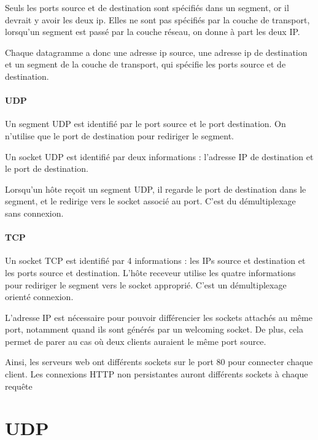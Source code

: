 	Seuls les ports source et de destination sont spécifiés dans un segment, or il devrait y avoir les deux ip. Elles ne sont pas spécifiés par la couche de transport, lorsqu'un segment est passé par la couche réseau, on donne à part les deux IP.
	
	Chaque datagramme a donc une adresse ip source, une adresse ip de destination et un segment de la couche de transport, qui spécifie les ports source et de destination.
	
	
	\paragraph{UDP} Un segment UDP est identifié par le port source et le port destination. On n'utilise que le port de destination pour rediriger le segment.
	
	Un socket UDP est identifié par deux informations : l'adresse IP de destination et le port de destination.
	
	Lorsqu'un hôte reçoit un segment UDP, il regarde le port de destination dans le segment, et le redirige vers le socket associé au port. C'est du démultiplexage sans connexion.
	
	
	
	
	\paragraph{TCP}	Un socket TCP est identifié par 4 informations : les IPs source et destination et les ports source et destination. L'hôte receveur utilise les quatre informations pour rediriger le segment vers le socket approprié. C'est un démultiplexage orienté connexion.
	
	L'adresse IP est nécessaire pour pouvoir différencier les sockets attachés au même port, notamment quand ils sont générés par un welcoming socket. De plus, cela permet de parer au cas où deux clients auraient le même port source.
	
	Ainsi, les serveurs web ont différents sockets sur le port 80 pour connecter chaque client. Les connexions HTTP non persistantes auront différents sockets à chaque requête
	
	
	
	
	
\section{UDP}


